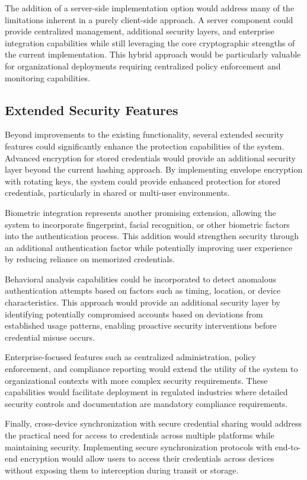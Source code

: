 \documentclass[11pt,a4paper]{article}
\begin{document}
The addition of a server-side implementation option would address many of the limitations inherent in a purely client-side approach. A server component could provide centralized management, additional security layers, and enterprise integration capabilities while still leveraging the core cryptographic strengths of the current implementation. This hybrid approach would be particularly valuable for organizational deployments requiring centralized policy enforcement and monitoring capabilities.
\subsection{Extended Security Features}
Beyond improvements to the existing functionality, several extended security features could significantly enhance the protection capabilities of the system. Advanced encryption for stored credentials would provide an additional security layer beyond the current hashing approach. By implementing envelope encryption with rotating keys, the system could provide enhanced protection for stored credentials, particularly in shared or multi-user environments.

Biometric integration represents another promising extension, allowing the system to incorporate fingerprint, facial recognition, or other biometric factors into the authentication process. This addition would strengthen security through an additional authentication factor while potentially improving user experience by reducing reliance on memorized credentials.

Behavioral analysis capabilities could be incorporated to detect anomalous authentication attempts based on factors such as timing, location, or device characteristics. This approach would provide an additional security layer by identifying potentially compromised accounts based on deviations from established usage patterns, enabling proactive security interventions before credential misuse occurs.

Enterprise-focused features such as centralized administration, policy enforcement, and compliance reporting would extend the utility of the system to organizational contexts with more complex security requirements. These capabilities would facilitate deployment in regulated industries where detailed security controls and documentation are mandatory compliance requirements.

Finally, cross-device synchronization with secure credential sharing would address the practical need for access to credentials across multiple platforms while maintaining security. Implementing secure synchronization protocols with end-to-end encryption would allow users to access their credentials across devices without exposing them to interception during transit or storage.
\end{document}
